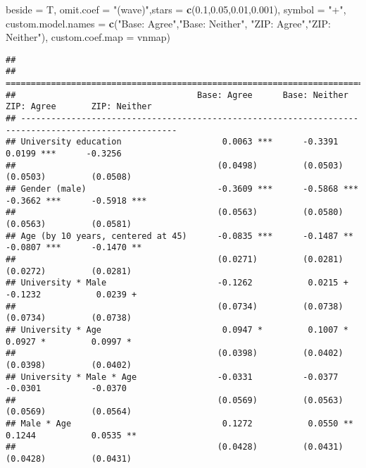 \documentclass[
]{article}
\newenvironment{Shaded}{\begin{snugshade}}{\end{snugshade}}
\newcommand{\DataTypeTok}[1]{\textcolor[rgb]{0.13,0.29,0.53}{#1}}
\newcommand{\FloatTok}[1]{\textcolor[rgb]{0.00,0.00,0.81}{#1}}
\newcommand{\KeywordTok}[1]{\textcolor[rgb]{0.13,0.29,0.53}{\textbf{#1}}}
\newcommand{\NormalTok}[1]{#1}
\newcommand{\StringTok}[1]{\textcolor[rgb]{0.31,0.60,0.02}{#1}}
\begin{document}
\begin{Shaded}
\begin{Highlighting}[]
          \DataTypeTok{beside =}\NormalTok{ T,}
          \DataTypeTok{omit.coef =} \StringTok{"(wave)"}\NormalTok{,}\DataTypeTok{stars =} \KeywordTok{c}\NormalTok{(}\FloatTok{0.1}\NormalTok{,}\FloatTok{0.05}\NormalTok{,}\FloatTok{0.01}\NormalTok{,}\FloatTok{0.001}\NormalTok{), }\DataTypeTok{symbol =} \StringTok{"+"}\NormalTok{, }
          \DataTypeTok{custom.model.names =} \KeywordTok{c}\NormalTok{(}\StringTok{"Base: Agree"}\NormalTok{,}\StringTok{"Base: Neither"}\NormalTok{,}
                                 \StringTok{"ZIP: Agree"}\NormalTok{,}\StringTok{"ZIP: Neither"}\NormalTok{),}
          \DataTypeTok{custom.coef.map =}\NormalTok{ vnmap)}
\end{Highlighting}
\end{Shaded}

\begin{verbatim}
## 
## =====================================================================================================
##                                    Base: Agree      Base: Neither    ZIP: Agree       ZIP: Neither   
## -----------------------------------------------------------------------------------------------------
## University education                    0.0063 ***      -0.3391           0.0199 ***      -0.3256    
##                                        (0.0498)         (0.0503)         (0.0503)         (0.0508)   
## Gender (male)                          -0.3609 ***      -0.5868 ***      -0.3662 ***      -0.5918 ***
##                                        (0.0563)         (0.0580)         (0.0563)         (0.0581)   
## Age (by 10 years, centered at 45)      -0.0835 ***      -0.1487 **       -0.0807 ***      -0.1470 ** 
##                                        (0.0271)         (0.0281)         (0.0272)         (0.0281)   
## University * Male                      -0.1262           0.0215 +        -0.1232           0.0239 +  
##                                        (0.0734)         (0.0738)         (0.0734)         (0.0738)   
## University * Age                        0.0947 *         0.1007 *         0.0927 *         0.0997 *  
##                                        (0.0398)         (0.0402)         (0.0398)         (0.0402)   
## University * Male * Age                -0.0331          -0.0377          -0.0301          -0.0370    
##                                        (0.0569)         (0.0563)         (0.0569)         (0.0564)   
## Male * Age                              0.1272           0.0550 **        0.1244           0.0535 ** 
##                                        (0.0428)         (0.0431)         (0.0428)         (0.0431)   

\end{verbatim}
\end{document}
